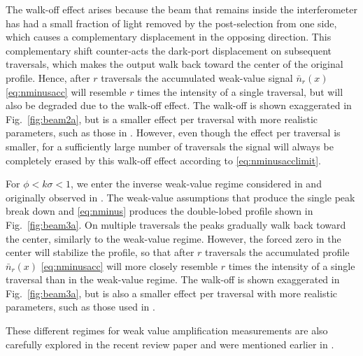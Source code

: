 The walk-off effect arises because the beam that remains inside the interferometer has had a small fraction of light removed by the post-selection from one side, which causes a complementary displacement in the opposing direction.  This complementary shift counter-acts the dark-port displacement on subsequent traversals, which makes the output walk back toward the center of the original profile.  Hence, after $r$ traversals the accumulated weak-value signal $\bar{n}_r(x)$ \eqref{eq:nminusacc} will resemble $r$ times the intensity of a single traversal, but will also be degraded due to the walk-off effect.  The walk-off is shown exaggerated in Fig.~\ref{fig:beam2a}, but is a smaller effect per traversal with more realistic parameters, such as those in \cite{Dixon2009}.  However, even though the effect per traversal is smaller, for a sufficiently large number of traversals the signal will always be completely erased by this walk-off effect according to \eqref{eq:nminusacclimit}.

For $\phi < k\sigma < 1$, we enter the inverse weak-value regime considered in \cite{Starling2010a,Starling2010b} and originally observed in \cite{Ritchie1991}.  The weak-value assumptions that produce the single peak break down and \eqref{eq:nminus} produces the double-lobed profile shown in Fig.~\ref{fig:beam3a}.  On multiple traversals the peaks gradually walk back toward the center, similarly to the weak-value regime.  However, the forced zero in the center will stabilize the profile, so that after $r$ traversals the accumulated profile $\bar{n}_r(x)$ \eqref{eq:nminusacc} will more closely resemble $r$ times the intensity of a single traversal than in the weak-value regime.  The walk-off is shown exaggerated in Fig.~\ref{fig:beam3a}, but is also a smaller effect per traversal with more realistic parameters, such as those used in \cite{Starling2010a,Starling2010b}.

These different regimes for weak value amplification measurements are also carefully explored in the recent review paper \cite{Kofman2012} and were mentioned earlier in \cite{DiLorenzo2012}.

